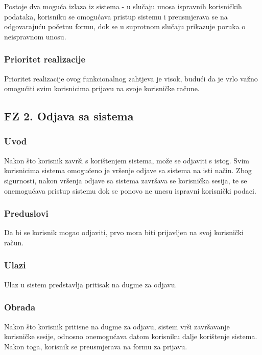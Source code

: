 \documentclass[12pt,a4paper]{article}
\begin{document}
Postoje dva moguća izlaza iz sistema - u slučaju unosa ispravnih korisničkih podataka, korisniku se omogućava pristup sistemu i preusmjerava se na odgovarajuću početnu formu, dok se u suprotnom slučaju prikazuje poruka o neispravnom unosu.

\subsubsection{Prioritet realizacije}

Prioritet realizacije ovog funkcionalnog zahtjeva je visok, budući da je vrlo važno omogućiti svim korisnicima prijavu na svoje korisničke račune.

\subsection{FZ 2. Odjava sa sistema}

\subsubsection{Uvod}

Nakon što korisnik završi s korištenjem sistema, može se odjaviti s istog. Svim korisnicima sistema omogućeno je vršenje odjave sa sistema na isti način. Zbog sigurnosti, nakon vršenja odjave sa sistema završava se korisnička sesija, te se onemogućava pristup sistemu dok se ponovo ne unesu ispravni korisnički podaci.

\subsubsection{Preduslovi}

Da bi se korisnik mogao odjaviti, prvo mora biti prijavljen na svoj korisnički račun.

\subsubsection{Ulazi}

Ulaz u sistem predstavlja pritisak na dugme za odjavu.

\subsubsection{Obrada}

Nakon što korisnik pritisne na dugme za odjavu, sistem vrši završavanje korisničke sesije, odnosno onemogućava datom korisniku dalje korištenje sistema. Nakon toga, korisnik se preusmjerava na formu za prijavu.
\end{document}
